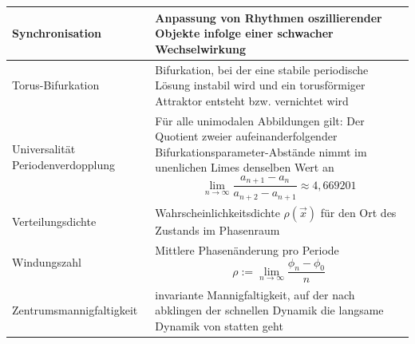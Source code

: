 \documentclass{article}
\begin{document}
\begin{xltabular}{\linewidth}{p{6cm}|X}
	\hline
		Synchronisation & Anpassung von Rhythmen oszillierender Objekte infolge einer schwacher Wechselwirkung \\
	\hline
		Torus-Bifurkation & Bifurkation, bei der eine stabile periodische Lösung instabil wird und ein torusförmiger Attraktor entsteht bzw. vernichtet wird \\
	\hline
		Universalität Periodenverdopplung & Für alle unimodalen Abbildungen gilt: Der Quotient zweier aufeinanderfolgender Bifurkationsparameter-Abstände nimmt im unenlichen Limes denselben Wert an
			$$\lim_{n\to\infty} \frac{a_{n+1} - a_n}{a_{n+2} - a_{n+1}} \approx 4,669201$$ \\
	\hline
		Verteilungsdichte & Wahrscheinlichkeitsdichte $\rho(\vec{x})$ für den Ort des Zustands im Phasenraum \\
	\hline
		Windungszahl & Mittlere Phasenänderung pro Periode
			$$\rho := \lim_{n \to \infty} \frac{\phi_n - \phi_0}{n}$$ \\
	\hline
		Zentrumsmannigfaltigkeit & invariante Mannigfaltigkeit, auf der nach abklingen der schnellen Dynamik die langsame Dynamik von statten geht \\
	\hline\hline
\end{xltabular}
\end{document}
